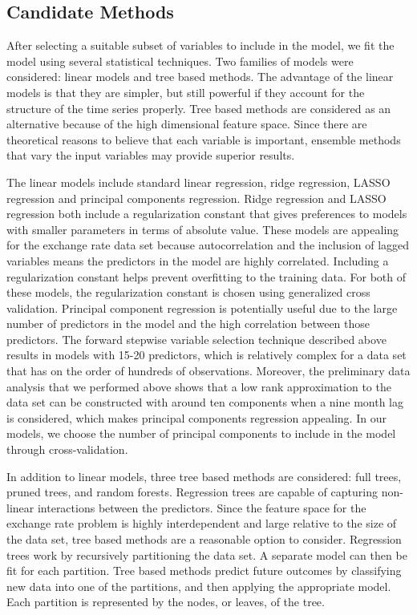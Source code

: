 \documentclass{sig-alternate-05-2015}
\begin{document}
\subsection{Candidate Methods}
After selecting a suitable subset of variables to include in the model, we fit the model using several statistical techniques. Two families of models were considered: linear models and tree based methods. The advantage of the linear models is that they are simpler, but still powerful if they account for the structure of the time series properly. Tree based methods are considered as an alternative because of the high dimensional feature space. Since there are theoretical reasons to believe that each variable is important, ensemble methods that vary the input variables may provide superior results.

\par{} The linear models include standard linear regression, ridge regression, LASSO regression and principal components regression. Ridge regression and LASSO regression both include a regularization constant that gives preferences to models with smaller parameters in terms of absolute value. These models are appealing for the exchange rate data set because autocorrelation and the inclusion of lagged variables means the predictors in the model are highly correlated. Including a regularization constant helps prevent overfitting to the training data. For both of these models, the regularization constant is chosen using generalized cross validation. Principal component regression is potentially useful due to the large number of predictors in the model and the high correlation between those predictors. The forward stepwise variable selection technique described above results in models with 15-20 predictors, which is relatively complex for a data set that has on the order of hundreds of observations. Moreover, the preliminary data analysis that we performed above shows that a low rank approximation to the data set can be constructed with around ten components when a nine month lag is considered, which makes principal components regression appealing. In our models, we choose the number of principal components to include in the model through cross-validation.

\par{} In addition to linear models, three tree based methods are considered: full trees, pruned trees, and random forests. Regression trees are capable of capturing non-linear interactions between the predictors. Since the feature space for the exchange rate problem is highly interdependent and large relative to the size of the data set, tree based methods are a reasonable option to consider. Regression trees work by recursively partitioning the data set. A separate model can then be fit for each partition. Tree based methods predict future outcomes by classifying new data into one of the partitions, and then applying the appropriate model. Each partition is represented by the nodes, or leaves, of the tree. 
\end{document}
